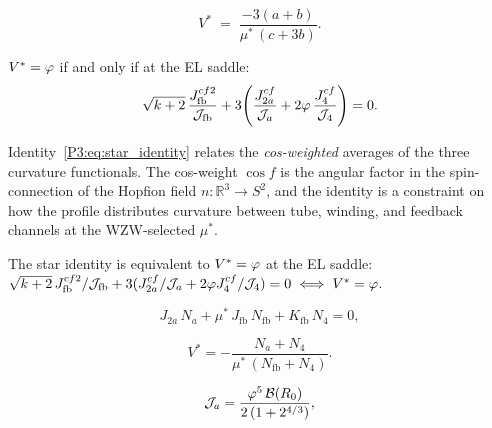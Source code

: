 \begin{equation}
  V^* \;=\; \frac{-3(a+b)}{\mu^*\,(c+3b)}.
  \label{P3:eq:V_from_poh_A}
\end{equation}

\begin{proposition}
\label{P3:prop:star_identity}
$V^*=\varphi$ if and only if at the EL saddle:
\begin{equation}
  \sqrt{k+2}\,\frac{J_{\mathrm{fb}}^{cf2}}{\mathcal{J}_{\mathrm{fb}}}
  + 3\!\left(\frac{J_{2a}^{cf}}{\mathcal{J}_a} + 2\varphi\,\frac{J_4^{cf}}{\mathcal{J}_4}\right) = 0.
  \label{P3:eq:star_identity}
\end{equation}
\end{proposition}

\begin{remark}
\label{P3:rem:star_identity_interp}
Identity~\eqref{P3:eq:star_identity} relates the \emph{cos-weighted} averages of
the three curvature functionals.  The cos-weight $\cos f$ is the angular factor
in the spin-connection of the Hopfion field $n: \mathbb{R}^3\to S^2$, and the
identity is a constraint on how the profile distributes curvature between
tube, winding, and feedback channels at the WZW-selected $\mu^*$.
\end{remark}

\begin{proposition}
\label{P3:prop:poh_a_equiv}
The star identity is equivalent to $V^*=\varphi$ at the EL saddle:
$\sqrt{k+2}\,J_{\mathrm{fb}}^{cf2}/\mathcal{J}_{\mathrm{fb}} + 3(J_{2a}^{cf}/\mathcal{J}_a + 2\varphi J_4^{cf}/\mathcal{J}_4)=0
\;\Longleftrightarrow\; V^*=\varphi$.
\end{proposition}

\begin{equation}
  J_{2a}\,N_a + \mu^*\,J_{\mathrm{fb}}\,N_{\mathrm{fb}} + K_{\mathrm{fb}}\,N_4 = 0,
  \label{P3:eq:pohozaev_b}
\end{equation}

\begin{equation}
  V^* = -\frac{N_a + N_4}{\mu^*\,(N_{\mathrm{fb}} + N_4)}.
  \label{P3:eq:virial_V}
\end{equation}

\begin{equation}
  \mathcal{J}_a = \frac{\varphi^5\,\mathcal{B}(R_0)}{2\,(1+2^{4/3})},
  \label{P3:eq:Ja_from_poh_d}
\end{equation}

